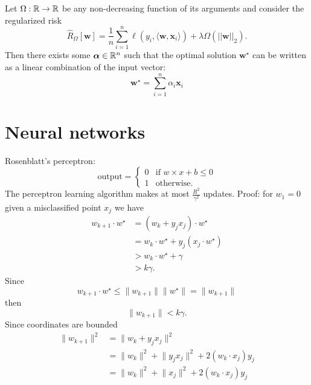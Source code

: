 \documentclass[a4paper,9pt]{extarticle}
\begin{document}
\begin{multicols*}{2}
\begin{riquadro}
	Let $\Omega:\mathbb{R}\to\mathbb{R}$ be any non-decreasing function of its arguments and consider the regularized risk
	\begin{equation*}
		\hat{R}_{\Omega}[\bm{w}]=\frac{1}{n}\sum_{i=1}^{n}\ell\left(y_{i},\langle\bm{w},\bm{x}_{i}\rangle\right)+\lambda\Omega\left(||\bm{w}||_{2}\right).
	\end{equation*}
	Then there exists some $\bm{\alpha}\in\mathbb{R}^{n}$ such that the optimal solution $\bm{w}^{\star}$ can be written as a linear combination of the input vector:
	\begin{equation*}
		\bm{w}^{\star}=\sum_{i=1}^{n}\alpha_{i}\bm{x}_{i}
	\end{equation*}
\end{riquadro}
\section{Neural networks}
Rosenblatt's perceptron:
\begin{equation*}
	\text{output}=\begin{cases}
		0&\text{if }w\times x+b\leq 0\\
		1&\text{otherwise}.
	\end{cases}
\end{equation*}
The perceptron learning algorithm makes at most $\frac{R^{2}}{\gamma^{2}}$ updates. Proof: for $w_{1}=0$ given a misclassified point $x_{j}$ we have
\begin{align*}
	w_{k+1}\cdot w^{\star}&=(w_{k}+y_{j}x_{j})\cdot w^{\star}\\
	&=w_{k}\cdot w^{\star}+y_{j}(x_{j}\cdot w^{\star})\\
	&>w_{k}\cdot w^{\star}+\gamma\\
	&>k\gamma.
\end{align*}
Since 
\begin{equation*}
	w_{k+1}\cdot w^{\star}\leq\lVert w_{k+1}\rVert\lVert w^{\star}\rVert=\lVert w_{k+1}\rVert
\end{equation*}
then
\begin{equation*}
	\lVert w_{k+1}\rVert<k\gamma.
\end{equation*}
Since coordinates are bounded
\begin{align*}
	\lVert w_{k+1}\rVert^{2}&=\lVert w_{k}+y_{j}x_{j}\rVert^{2}\\
	&=\lVert w_{k}\rVert^{2}+\lVert y_{j}x_{j}\rVert^{2}+2(w_{k}\cdot x_{j})y_{j}\\
	&=\lVert w_{k}\rVert^{2}+\lVert x_{j}\rVert^{2}+2(w_{k}\cdot x_{j})y_{j}\\

\end{align*}
\end{multicols*}
\end{document}
